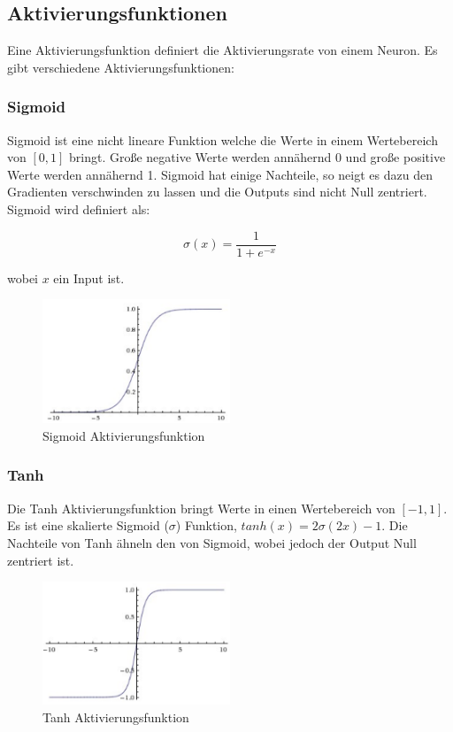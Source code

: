 \subsection{Aktivierungsfunktionen}\label{subsection:aktivierungsfunktionen}
Eine Aktivierungsfunktion definiert die Aktivierungsrate von einem Neuron. Es gibt verschiedene Aktivierungsfunktionen:

\subsubsection{Sigmoid}
Sigmoid ist eine nicht lineare Funktion welche die Werte in einem Wertebereich von $ [0, 1] $ bringt.
Große negative Werte werden annähernd 0 und große positive Werte werden annähernd 1. Sigmoid hat einige Nachteile, so neigt es dazu den Gradienten
verschwinden zu lassen und die Outputs sind nicht Null zentriert. Sigmoid wird definiert als:

\begin{equation}
  \sigma(x) = \frac{1}{1 + e^{-x}}
\end{equation}

wobei $x$ ein Input ist.

\begin{figure}[H]
  \centering
  \includegraphics[width=0.5\textwidth]{resources/nn/sigmoid.png}
  \caption{
    Sigmoid Aktivierungsfunktion 
    \cite{neuron-model}
  }
  \label{image:sigmoid}
\end{figure}

\subsubsection{Tanh}
Die Tanh Aktivierungsfunktion bringt Werte in einen Wertebereich von $ [-1, 1] $. Es ist eine skalierte Sigmoid ($ \sigma $) Funktion,
$ tanh(x) = 2\sigma(2x) - 1 $. Die Nachteile von Tanh ähneln den von Sigmoid, wobei jedoch der Output Null zentriert ist.

\begin{figure}[H]
  \centering
  \includegraphics[width=0.5\textwidth]{resources/nn/tanh.png}
  \caption{
    Tanh Aktivierungsfunktion 
    \cite{neuron-model}
  }
  \label{image:tanh}
\end{figure}

